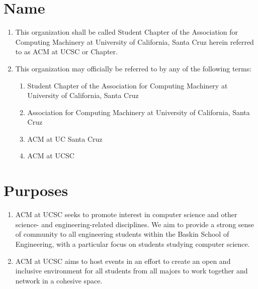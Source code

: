 
\section{Name}
\begin{enumerate}
	\item This organization shall be called Student Chapter of the Association for Computing Machinery at University of California, Santa Cruz herein referred to as ACM at UCSC or Chapter.
	\item This organization may officially be referred to by any of the following terms:
	\begin{enumerate}
		\item Student Chapter of the Association for Computing Machinery at University of California, Santa Cruz
		\item Association for Computing Machinery at University of California, Santa Cruz
		\item ACM at UC Santa Cruz
		\item ACM at UCSC
	\end{enumerate}
\end{enumerate}

\section{Purposes}
\begin{enumerate}
	\item ACM at UCSC seeks to promote interest in computer science and other science- and engineering-related disciplines. We aim to provide a strong sense of community to all engineering students within the Baskin School of Engineering, with a particular focus on students studying computer science.
	\item ACM at UCSC aims to host events in an effort to create an open and inclusive environment for all students from all majors to work together and network in a cohesive space.
\end{enumerate}

\newpage
